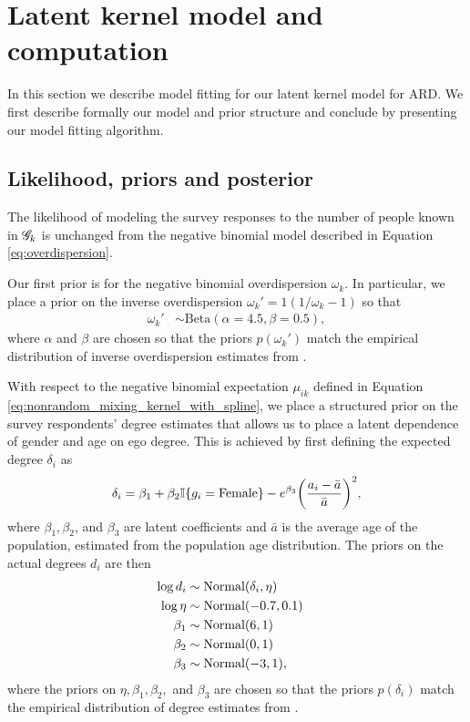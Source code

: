 \section{Latent kernel model and computation}
\label{sec:kernel_model}

In this section we describe model fitting for our latent kernel model for ARD. We first describe formally our model and prior structure and conclude by presenting our model fitting algorithm.

\subsection{Likelihood, priors and posterior}
\label{subsec:kernel_prior}

The likelihood of modeling the survey responses to the number of people known in $\mathcal{G}_k$ is unchanged from the \citet{Zheng+others:2006} negative binomial model described in Equation \ref{eq:overdispersion}. 

Our first prior is for the negative binomial overdispersion $\omega_k$. In particular, we place a prior on the inverse overdispersion $\omega_k' = 1(1/\omega_k - 1)$ so that
\begin{align}
\omega_k' &\sim \text{Beta}(\alpha = 4.5, \beta = 0.5),
\end{align}
where $\alpha$ and $\beta$ are chosen so that the priors $p(\omega_k')$ match the empirical distribution of inverse overdispersion estimates from \citet{McCormick+others:2010}.

With respect to the negative binomial expectation $\mu_{ik}$ defined in Equation \ref{eq:nonrandom_mixing_kernel_with_spline}, we place a structured prior on the survey respondents' degree estimates that allows us to place a latent dependence of gender and age on ego degree. This is achieved by first defining the expected degree $\delta_i$ as
\begin{align}
\delta_i = \beta_1 + \beta_2 \mathbb{I}\{g_i = \text{Female}\} - e^{\beta_3} \biggl( \frac{a_i - \bar{a}}{\bar{a}} \biggr)^2,
\end{align}
where $\beta_1, \beta_2$, and $\beta_3$ are latent coefficients and $\bar{a}$ is the average age of the population, estimated from the population age distribution. The priors on the actual degrees $d_i$ are then
\begin{align}
\log d_i &\sim \text{Normal}(\delta_i, \eta) && \\\nonumber
\log \eta &\sim \text{Normal}(-0.7, 0.1) && \\\nonumber
\beta_1 &\sim \text{Normal}(6, 1) && \\\nonumber
\beta_2 &\sim \text{Normal}(0, 1) && \\\nonumber
\beta_3 &\sim \text{Normal}(-3, 1),
\end{align} 
where the priors on $\eta, \beta_1, \beta_2,$ and $\beta_3$ are chosen so that the priors $p(\delta_i)$ match the empirical distribution of degree estimates from \citet{McCormick+others:2010}.

